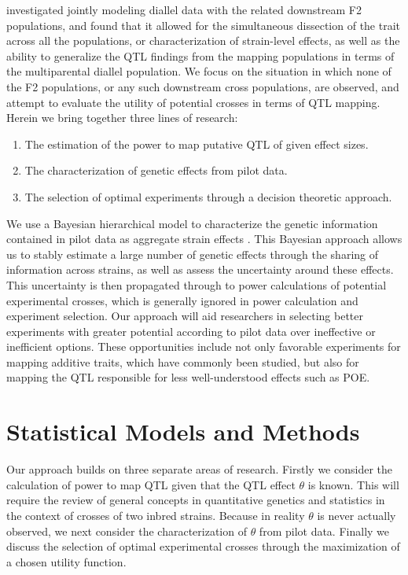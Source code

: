 
\cite{Verhoeven2006} investigated jointly modeling diallel data with the related downstream F2 populations, and found that it allowed for the simultaneous dissection of the trait across all the populations, or characterization of strain-level effects, as well as the ability to generalize the QTL findings from the mapping populations in terms of the multiparental diallel population. We focus on the situation in which none of the F2 populations, or any such downstream cross populations, are observed, and attempt to evaluate the utility of potential crosses in terms of QTL mapping. Herein we bring together three lines of research: 
\begin{enumerate}
	\item The estimation of the power to map putative QTL of given effect sizes.
	\item The characterization of genetic effects from pilot data.
	\item The selection of optimal experiments through a decision theoretic approach.
\end{enumerate}
We use a Bayesian hierarchical model to characterize the genetic information contained in pilot data as aggregate strain effects \citep{Lenarcic2012}. This Bayesian approach allows us to stably estimate a large number of genetic effects through the sharing of information across strains, as well as assess the uncertainty around these effects. This uncertainty is then propagated through to power calculations of potential experimental crosses, which is generally ignored in power calculation and experiment selection. Our approach will aid researchers in selecting better experiments with greater potential according to pilot data over ineffective or inefficient options. These opportunities include not only favorable experiments for mapping additive traits, which have commonly been studied, but also for mapping the QTL responsible for less well-understood effects such as POE.

\section{Statistical Models and Methods}

Our approach builds on three separate areas of research. Firstly we consider the calculation of power to map QTL given that the QTL effect $\theta$ is known. This will require the review of general concepts in quantitative genetics and statistics in the context of crosses of two inbred strains. Because in reality $\theta$ is never actually observed, we next consider the characterization of $\theta$ from pilot data. Finally we discuss the selection of optimal experimental crosses through the maximization of a chosen utility function.


